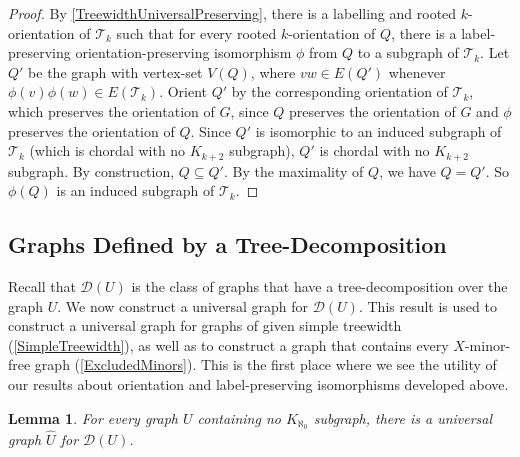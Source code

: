 \documentclass[a4paper,11pt]{article}
\theoremstyle{plain}
\newtheorem{lem}[thm]{Lemma}
\theoremstyle{definition}
\newcommand{\DD}{\mathcal{D}}
\newcommand{\TT}{\mathcal{T}}
\begin{document}
\begin{proof}
By \cref{TreewidthUniversalPreserving}, there is a labelling and rooted $k$-orientation of $\TT_k$ such that for every rooted $k$-orientation of $Q$, there is a label-preserving orientation-preserving isomorphism $\phi$ from $Q$ to a subgraph of $\TT_k$. Let $Q'$ be the graph with vertex-set $V(Q)$, where $vw\in E(Q')$ whenever $\phi(v)\phi(w)\in E(\TT_k)$. Orient $Q'$ by the corresponding orientation of $\TT_k$, which preserves the orientation of $G$, since $Q$ preserves the orientation of $G$ and $\phi$ preserves the orientation of $Q$. Since $Q'$ is isomorphic to an induced subgraph of $\TT_k$ (which is chordal with no $K_{k+2}$ subgraph), $Q'$ is chordal with no $K_{k+2}$ subgraph. By construction, $Q\subseteq Q'$. By the maximality of $Q$, we have $Q=Q'$. So 
$\phi(Q)$ is an induced subgraph of $\TT_k$. 
\end{proof}

\subsection{Graphs Defined by a Tree-Decomposition}
\label{DefinedByTreeDecomposition}

Recall that $\DD(U)$ is the class of graphs that have a tree-decomposition over the graph $U$. We now construct a universal graph for $\DD(U)$.  This result is used to construct a universal graph for graphs of given simple treewidth (\cref{SimpleTreewidth}), as well as to construct a graph that contains every $X$-minor-free graph (\cref{ExcludedMinors}). This is the first place where we see the utility of our results about orientation and label-preserving isomorphisms developed above. 

\begin{lem}
\label{TreeDecompUniversal}
For every graph $U$ containing no $K_{\aleph_0}$ subgraph, there is a universal graph $\widehat{U}$ for $\DD(U)$.
\end{lem}
\end{document}
